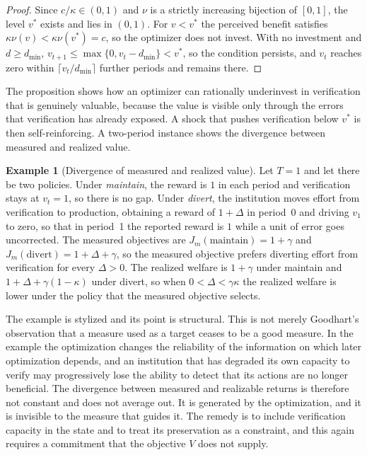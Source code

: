 \documentclass[11pt]{article}
\theoremstyle{definition}
\newtheorem{example}{Example}
\theoremstyle{remark}
\begin{document}
\begin{proof}
Since $c/\kappa\in(0,1)$ and $\nu$ is a strictly increasing bijection of $[0,1]$, the level $v^{*}$ exists and lies in $(0,1)$. For $v<v^{*}$ the perceived benefit satisfies $\kappa\nu(v)<\kappa\nu(v^{*})=c$, so the optimizer does not invest. With no investment and $d\ge d_{\min}$, $v_{t+1}\le\max\{0,v_t-d_{\min}\}<v^{*}$, so the condition persists, and $v_t$ reaches zero within $\lceil v_t/d_{\min}\rceil$ further periods and remains there.
\end{proof}

The proposition shows how an optimizer can rationally underinvest in verification that is genuinely valuable, because the value is visible only through the errors that verification has already exposed. A shock that pushes verification below $v^{*}$ is then self-reinforcing. A two-period instance shows the divergence between measured and realized value.

\begin{example}[Divergence of measured and realized value]
\label{ex:diverge}
Let $T=1$ and let there be two policies. Under \emph{maintain}, the reward is $1$ in each period and verification stays at $v_t=1$, so there is no gap. Under \emph{divert}, the institution moves effort from verification to production, obtaining a reward of $1+\Delta$ in period~0 and driving $v_1$ to zero, so that in period~1 the reported reward is $1$ while a unit of error goes uncorrected. The measured objectives are $J_m(\text{maintain})=1+\gamma$ and $J_m(\text{divert})=1+\Delta+\gamma$, so the measured objective prefers diverting effort from verification for every $\Delta>0$. The realized welfare is $1+\gamma$ under maintain and $1+\Delta+\gamma(1-\kappa)$ under divert, so when $0<\Delta<\gamma\kappa$ the realized welfare is lower under the policy that the measured objective selects.
\end{example}

The example is stylized and its point is structural. This is not merely Goodhart's observation that a measure used as a target ceases to be a good measure. In the example the optimization changes the reliability of the information on which later optimization depends, and an institution that has degraded its own capacity to verify may progressively lose the ability to detect that its actions are no longer beneficial. The divergence between measured and realizable returns is therefore not constant and does not average out. It is generated by the optimization, and it is invisible to the measure that guides it. The remedy is to include verification capacity in the state and to treat its preservation as a constraint, and this again requires a commitment that the objective $V$ does not supply.
\end{document}

